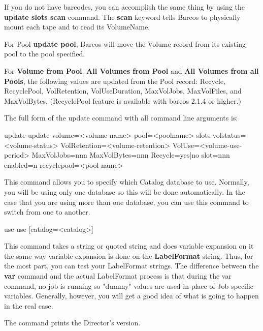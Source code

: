 \begin{description}
   If you do not have barcodes, you can accomplish the same thing
   by using the {\bf update slots scan} command.
   The {\bf scan} keyword tells Bareos to physically mount each tape and to
   read its VolumeName.

   For Pool {\bf update pool}, Bareos will move the Volume record from its
   existing pool to the pool specified.

   For {\bf Volume from Pool}, {\bf All Volumes from Pool} and {\bf All Volumes
     from all Pools}, the following values are updated from the Pool record:
   Recycle, RecyclePool, VolRetention, VolUseDuration, MaxVolJobs, MaxVolFiles,
   and MaxVolBytes.  (RecyclePool feature is available with bareos 2.1.4 or
   higher.)

   The full form of the update command with all command line arguments is:

\begin{bconsole}{update}
update volume=<volume-name> pool=<poolname>
  slots volstatus=<volume-status> VolRetention=<volume-retention>
  VolUse=<volume-use-period> MaxVolJobs=nnn MaxVolBytes=nnn Recycle=yes|no
  slot=nnn enabled=n recyclepool=<pool-name>
\end{bconsole}


\item [use]
   This command allows you to specify which Catalog  database to use. Normally,
   you will be using only one database so  this will be done automatically. In
   the case that you are using  more than one database, you can use this command
   to switch from  one to another.

\begin{bconsole}{use}
use [catalog=<catalog>]
\end{bconsole}

\item [var]
   \label{var}
   This command takes a string or quoted string and  does variable expansion on
   it the same way variable expansion  is done on the {\bf LabelFormat} string.
   Thus, for the  most part, you can test your LabelFormat strings. The
   difference  between the {\bf var} command and the actual LabelFormat process
   is that during the var command, no job is running so "dummy"  values are
   used in place of Job specific variables. Generally,  however, you will get a
   good idea of what is going to happen  in the real case.

\item [version]
   The command prints the Director's version.


\end{description}
